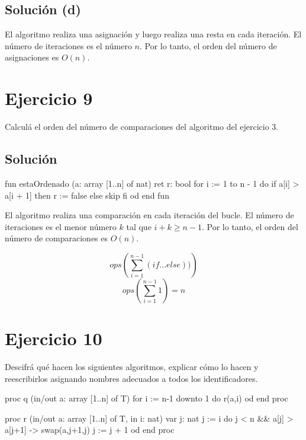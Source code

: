 \documentclass{article}
\begin{document}
\subsection{Solución (d)}
El algoritmo realiza una asignación y luego realiza una resta en cada iteración. El número de iteraciones es el número $n$. Por lo tanto, el orden del número de asignaciones es $O(n)$.


\section{Ejercicio 9}
Calculá el orden del número de comparaciones del algoritmo del ejercicio 3.

\subsection{Solución}

\begin{codebox}
\begin{pascallike}
fun estaOrdenado (a: array [1..n] of nat) ret r: bool
    for i := 1 to n - 1 do
    if a[i] > a[i + 1] then
        r := false
    else
        skip
    fi
    od
end fun
\end{pascallike}
\end{codebox}

El algoritmo realiza una comparación en cada iteración del bucle. El número de iteraciones es el menor número $k$ tal que $i + k \geq n-1$. Por lo tanto, el orden del número de comparaciones es $O(n)$.

$$ ops\left( \sum_{i=1}^{n-1} (if...else)) \right)$$
$$ ops\left( \sum_{i=1}^{n-1} 1 \right) = n$$

\section{Ejercicio 10}
Descifrá qué hacen los siguientes algoritmos, explicar cómo lo hacen y reescribirlos asignando nombres adecuados a todos los identificadores.

\begin{codebox}
\begin{pascallike}
proc q (in/out a: array [1..n] of T)
    for i := n-1 downto 1 do
    r(a,i)
    od
end proc
\end{pascallike}
\end{codebox}

\begin{codebox}
\begin{pascallike}
proc r (in/out a: array [1..n] of T, in i: nat)
    var j: nat
    j := i
    do j < n && a[j] > a[j+1] ->
    swap(a,j+1,j)
    j := j + 1
    od
end proc
\end{pascallike}
\end{codebox}
\end{document}
